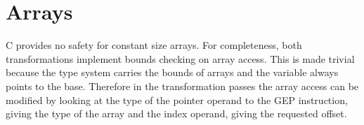 %
%
%
%
%
%
%

\section{Arrays}

C provides no safety for constant size arrays.
For completeness, both transformations implement bounds checking on array access.
This is made trivial because the type system carries the bounds of arrays and the variable always points to the base. 
Therefore in the transformation passes the array access can be modified by looking at the type of the pointer operand to the GEP instruction, giving the type of the array and the index operand, giving the requested offset.
